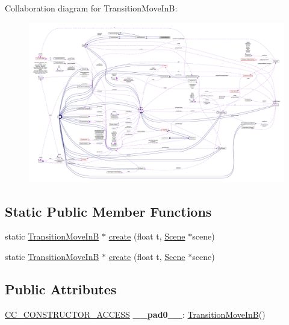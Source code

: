 Collaboration diagram for Transition\+Move\+InB\+:
\nopagebreak
\begin{figure}[H]
\begin{center}
\leavevmode
\includegraphics[width=350pt]{classTransitionMoveInB__coll__graph}
\end{center}
\end{figure}
\subsection*{Static Public Member Functions}
\begin{DoxyCompactItemize}
\item 
static \hyperlink{classTransitionMoveInB}{Transition\+Move\+InB} $\ast$ \hyperlink{classTransitionMoveInB_a2940a32c9c4962f456e72bbdb36d06a8}{create} (float t, \hyperlink{classScene}{Scene} $\ast$scene)
\item 
static \hyperlink{classTransitionMoveInB}{Transition\+Move\+InB} $\ast$ \hyperlink{classTransitionMoveInB_a81feb7a2e4af1ea60bdc384c8dd49b9d}{create} (float t, \hyperlink{classScene}{Scene} $\ast$scene)
\end{DoxyCompactItemize}
\subsection*{Public Attributes}
\begin{DoxyCompactItemize}
\item 
\mbox{\label{classTransitionMoveInB_aabd6c30a8b38a30c96c701ff667595bd}} 
\hyperlink{_2cocos2d_2cocos_2base_2ccConfig_8h_a25ef1314f97c35a2ed3d029b0ead6da0}{C\+C\+\_\+\+C\+O\+N\+S\+T\+R\+U\+C\+T\+O\+R\+\_\+\+A\+C\+C\+E\+SS} {\bfseries \+\_\+\+\_\+pad0\+\_\+\+\_\+}\+: \hyperlink{classTransitionMoveInB}{Transition\+Move\+InB}()
\end{DoxyCompactItemize}
